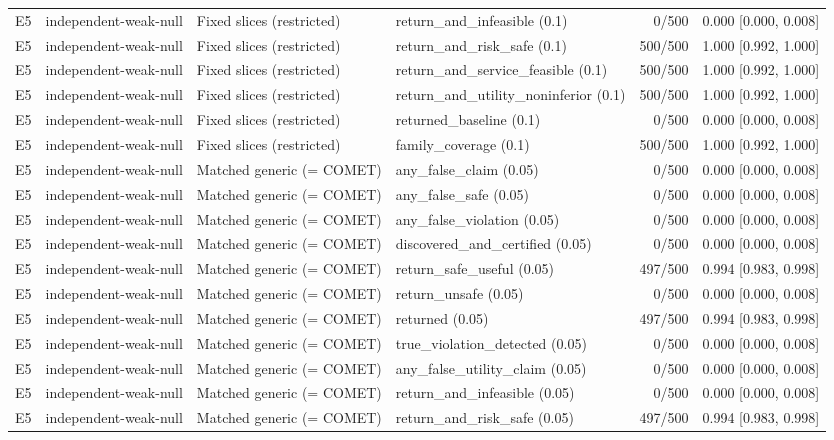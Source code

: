 \begin{longtable}{p{.04\linewidth}p{.18\linewidth}p{.19\linewidth}p{.16\linewidth}r p{.21\linewidth}}
E5 & independent-weak-null & Fixed slices (restricted) & return\_and\_infeasible (0.1) & 0/500 & 0.000 [0.000, 0.008]\\
E5 & independent-weak-null & Fixed slices (restricted) & return\_and\_risk\_safe (0.1) & 500/500 & 1.000 [0.992, 1.000]\\
E5 & independent-weak-null & Fixed slices (restricted) & return\_and\_service\_feasible (0.1) & 500/500 & 1.000 [0.992, 1.000]\\
E5 & independent-weak-null & Fixed slices (restricted) & return\_and\_utility\_noninferior (0.1) & 500/500 & 1.000 [0.992, 1.000]\\
E5 & independent-weak-null & Fixed slices (restricted) & returned\_baseline (0.1) & 0/500 & 0.000 [0.000, 0.008]\\
E5 & independent-weak-null & Fixed slices (restricted) & family\_coverage (0.1) & 500/500 & 1.000 [0.992, 1.000]\\
E5 & independent-weak-null & Matched generic (= COMET) & any\_false\_claim (0.05) & 0/500 & 0.000 [0.000, 0.008]\\
E5 & independent-weak-null & Matched generic (= COMET) & any\_false\_safe (0.05) & 0/500 & 0.000 [0.000, 0.008]\\
E5 & independent-weak-null & Matched generic (= COMET) & any\_false\_violation (0.05) & 0/500 & 0.000 [0.000, 0.008]\\
E5 & independent-weak-null & Matched generic (= COMET) & discovered\_and\_certified (0.05) & 0/500 & 0.000 [0.000, 0.008]\\
E5 & independent-weak-null & Matched generic (= COMET) & return\_safe\_useful (0.05) & 497/500 & 0.994 [0.983, 0.998]\\
E5 & independent-weak-null & Matched generic (= COMET) & return\_unsafe (0.05) & 0/500 & 0.000 [0.000, 0.008]\\
E5 & independent-weak-null & Matched generic (= COMET) & returned (0.05) & 497/500 & 0.994 [0.983, 0.998]\\
E5 & independent-weak-null & Matched generic (= COMET) & true\_violation\_detected (0.05) & 0/500 & 0.000 [0.000, 0.008]\\
E5 & independent-weak-null & Matched generic (= COMET) & any\_false\_utility\_claim (0.05) & 0/500 & 0.000 [0.000, 0.008]\\
E5 & independent-weak-null & Matched generic (= COMET) & return\_and\_infeasible (0.05) & 0/500 & 0.000 [0.000, 0.008]\\
E5 & independent-weak-null & Matched generic (= COMET) & return\_and\_risk\_safe (0.05) & 497/500 & 0.994 [0.983, 0.998]\\

\end{longtable}
